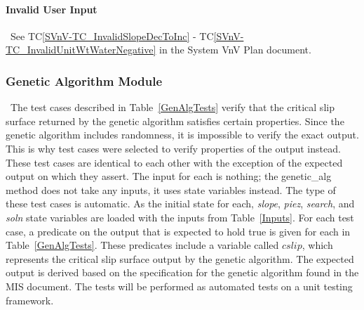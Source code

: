 \documentclass[12pt, titlepage]{article}
\newcommand{\tcref}[1]{TC\ref{#1}}
\begin{document}
\paragraph{Invalid User Input}
~\newline \noindent See \tcref{SVnV-TC_InvalidSlopeDecToInc} - 
\tcref{SVnV-TC_InvalidUnitWtWaterNegative} in the System VnV Plan document.


\subsubsection{Genetic Algorithm Module}

~\newline \noindent The test cases described in Table~\ref{GenAlgTests} 
verify that the critical slip surface returned by the genetic algorithm 
satisfies certain properties. Since the genetic algorithm includes randomness, 
it is impossible to verify the exact output. This is why test cases were 
selected to verify properties of the output instead. These test cases are 
identical to each other with the exception of the expected output on which they 
assert. The input for each is nothing; the genetic\_alg method does not take 
any inputs, it uses state variables instead. The type of these test cases is 
automatic. As the initial state for each, \textit{slope}, \textit{piez}, 
\textit{search}, and \textit{soln} state variables are loaded with the inputs 
from Table~\ref{Inputs}. For each test case, a predicate on the output that is 
expected to hold true is given for each in Table~\ref{GenAlgTests}. These 
predicates include a variable called $cslip$, which represents the critical 
slip surface output by the genetic algorithm. The expected output is derived 
based on the specification for the genetic algorithm found in the MIS document. 
The tests will be performed as automated tests on a unit testing framework.
\end{document}

